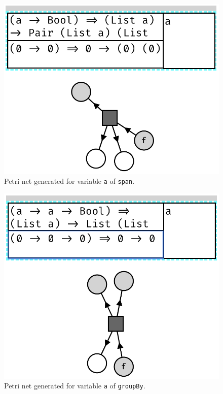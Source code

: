 \documentclass[11pt,openright,hidelinks,a4paper]{article}
\begin{document}
\begin{figure}[H]
\begin{center}
\includegraphics[scale=0.45]{span}
\end{center}
\caption{Petri net generated for variable \lstinline{a} of \lstinline{span}.}
\label{fig:foldr}
\end{figure}

\begin{figure}[H]
\begin{center}
\includegraphics[scale=0.45]{groupBy}
\end{center}
\caption{Petri net generated for variable \lstinline{a} of \lstinline{groupBy}.}
\label{fig:groupBy}
\end{figure}
\end{document}

